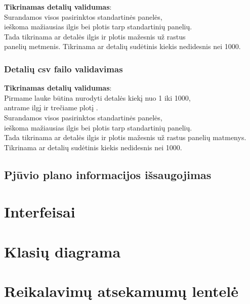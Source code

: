 \documentclass[a4paper,12pt]{article}
\begin{document}
\textbf{Tikrinamas detalių validumas}:\\
Surandamos visos pasirinktos standartinės panelės, \\
ieškoma mažiausias ilgis bei plotis tarp standartinių panelių.\\
Tada tikrinama ar detalės ilgis ir plotis mažesnis už rastus \\
panelių metmenis.
Tikrinama ar detalių sudėtinis kiekis nedidesnis nei 1000.

\subsubsection{Detalių csv failo validavimas}
\textbf{Tikrinamas detalių validumas}:\\
Pirmame lauke būtina nurodyti detalės kiekį nuo 1 iki 1000, \\
antrame ilgį ir trečiame plotį .\\

Surandamos visos pasirinktos standartinės panelės, \\
ieškoma mažiausias ilgis bei plotis tarp standartinių panelių.\\
Tada tikrinama ar detalės ilgis ir plotis mažesnis už rastus
panelių matmenys. \\
Tikrinama ar detalių sudėtinis kiekis nedidesnis nei 1000.

\subsection{ Pjūvio plano informacijos išsaugojimas }



\section{Interfeisai}


\section{Klasių diagrama}


\section{Reikalavimų atsekamumų lentelė}
\end{document}
